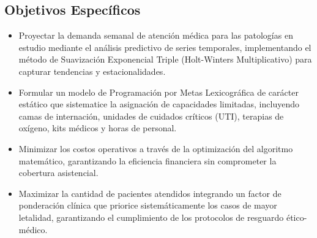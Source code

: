 \documentclass[conference]{IEEEtran}
\begin{document}
\subsection{Objetivos Específicos}
\begin{itemize}
    \item Proyectar la demanda semanal de atención médica para las patologías en estudio mediante el análisis predictivo de series temporales, implementando el método de Suavización Exponencial Triple (Holt-Winters Multiplicativo) para capturar tendencias y estacionalidades.
    \item Formular un modelo de Programación por Metas Lexicográfica de carácter estático que sistematice la asignación de capacidades limitadas, incluyendo camas de internación, unidades de cuidados críticos (UTI), terapias de oxígeno, kits médicos y horas de personal.
    \item Minimizar los costos operativos a través de la optimización del algoritmo matemático, garantizando la eficiencia financiera sin comprometer la cobertura asistencial.
    \item Maximizar la cantidad de pacientes atendidos integrando un factor de ponderación clínica que priorice sistemáticamente los casos de mayor letalidad, garantizando el cumplimiento de los protocolos de resguardo ético-médico.
\end{itemize}
\end{document}
